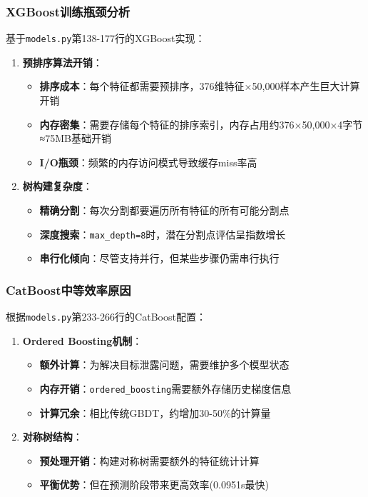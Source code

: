 \documentclass[UTF8]{report}
\theoremstyle{MyLineTheoremStyle} %
\theoremstyle{MyBlockTheoremStyle} %
\theoremstyle{MySubsubsectionStyle} %
\begin{document}
\subsubsection{XGBoost训练瓶颈分析}
基于\texttt{models.py}第138-177行的XGBoost实现：
\begin{enumerate}
    \item \textbf{预排序算法开销}：
    \begin{itemize}
        \item \textbf{排序成本}：每个特征都需要预排序，376维特征×50,000样本产生巨大计算开销
        \item \textbf{内存密集}：需要存储每个特征的排序索引，内存占用约376×50,000×4字节≈75MB基础开销
        \item \textbf{I/O瓶颈}：频繁的内存访问模式导致缓存miss率高
    \end{itemize}
    \item \textbf{树构建复杂度}：
    \begin{itemize}
        \item \textbf{精确分割}：每次分割都要遍历所有特征的所有可能分割点
        \item \textbf{深度搜索}：\texttt{max\_depth=8}时，潜在分割点评估呈指数增长
        \item \textbf{串行化倾向}：尽管支持并行，但某些步骤仍需串行执行
    \end{itemize}
\end{enumerate}

\subsubsection{CatBoost中等效率原因}
根据\texttt{models.py}第233-266行的CatBoost配置：
\begin{enumerate}
    \item \textbf{Ordered Boosting机制}：
    \begin{itemize}
        \item \textbf{额外计算}：为解决目标泄露问题，需要维护多个模型状态
        \item \textbf{内存开销}：\texttt{ordered\_boosting}需要额外存储历史梯度信息
        \item \textbf{计算冗余}：相比传统GBDT，约增加30-50\%的计算量
    \end{itemize}
    \item \textbf{对称树结构}：
    \begin{itemize}
        \item \textbf{预处理开销}：构建对称树需要额外的特征统计计算
        \item \textbf{平衡优势}：但在预测阶段带来更高效率(0.0951s最快)
    \end{itemize}
\end{enumerate}
\end{document}
